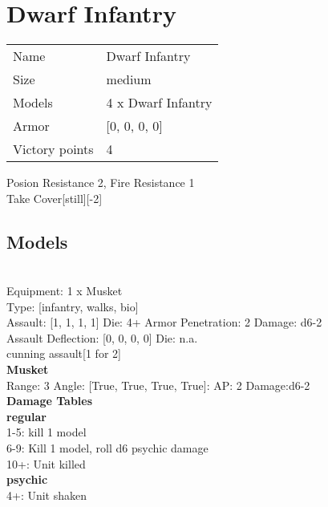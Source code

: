\pagebreak\pagebreak

\section{ Dwarf Infantry }

\begin{tabular}{ll}
  Name & Dwarf Infantry \\
  Size & medium\\
  Models & 4 x Dwarf Infantry\\
  Armor & [0, 0, 0, 0]\\
  Victory points & 4\\
\end{tabular}

Posion Resistance 2, Fire Resistance 1\\ 
Take Cover[still][-2]\\ 


\subsection{ Models }

 \\
Equipment: 1 x Musket \\
Type: [infantry, walks, bio] \\

Assault: [1, 1, 1, 1] Die: 4+ Armor Penetration: 2 Damage: d6-2 \\
Assault Deflection: [0, 0, 0, 0] Die: n.a.\\
\indent cunning assault[1 for 2]\\ 
 



{\bf Musket } \\



Range: 3  Angle: [True, True, True, True]: AP: 2 Damage:d6-2 \\




 





{\bf Damage Tables} \\
 {\bf regular } \\
1-5: kill 1 model \\
6-9: Kill 1 model, roll d6 psychic damage \\
10+: Unit killed \\
 {\bf psychic } \\
4+: Unit shaken \\










\pagebreak
